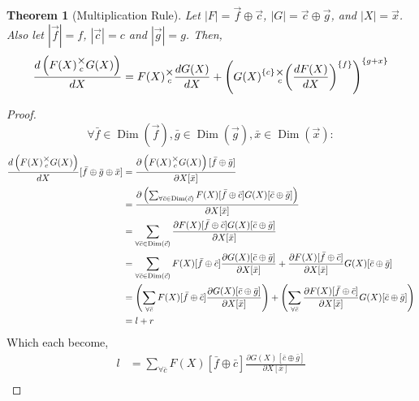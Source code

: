 \documentclass[12pt]{book}
\theoremstyle{plain}
\newtheorem{theorem}{Theorem}[chapter]
\theoremstyle{definition}
\theoremstyle{ppart}
\theoremstyle{case}
\theoremstyle{solution}
\DeclareMathOperator{\Dim}{Dim}
\newcommand{\mmult}[1]{\text{\raisebox{1ex}{$\underset{#1}{\times}$}}}
\newcommand{\shape}[1]{\left|#1\right|}
\newcommand{\transpose}[2]{{#1}^{\{#2\}}}
\begin{document}
\begin{landscape}
\begin{theorem}[Multiplication Rule]
\label{multiplication_rule}
Let $\shape{F} = \vec{f} \oplus \vec{c}$, $\shape{G} = \vec{c} \oplus \vec{g}$,
and $\shape{X} = \vec{x}$.
Also let $\shape{\vec{f}} = f$, $\shape{\vec{c}} = c$ and $\shape{\vec{g}} = g$.
Then,
\begin{align*}
  \frac{d\left(F(X) \mmult{c} G(X)\right)}{dX} =
  F(X) \mmult{c} \frac{dG(X)}{dX} +
  \transpose{\left(
     \transpose{G(X)}{c}
       \mmult{c}
     \transpose{\left( \frac{dF(X)}{dX} \right)}{f}
  \right)}
  {g+x}
\end{align*}
\end{theorem}
\begin{proof}
\[
 \forall
  \bar{f} \in \Dim(\vec{f}),
  \bar{g} \in \Dim(\vec{g}),
  \bar{x} \in \Dim(\vec{x})
 :
\]
\begin{align*}
 \frac{d\left(F(X) \mmult{c} G(X)\right)}{dX}
  [\bar{f} \oplus \bar{g} \oplus \bar{x}]
 &= \frac{
       \partial \left(F(X) \mmult{c} G(X)\right)[\bar{f} \oplus \bar{g}]
    }{
       \partial X[\bar{x}]
    } \\
 &= \frac{
       \partial \left(
        \sum_{\forall \bar{c} \in \Dim(\vec{c})}
         F(X)[\bar{f} \oplus \bar{c}] G(X)[\bar{c} \oplus \bar{g}]
      \right)
    }{
       \partial X[\bar{x}]
    } \\
 &= \sum_{\forall \bar{c} \in \Dim(\vec{c})}
    \frac{
      \partial F(X)[\bar{f} \oplus \bar{c}] G(X)[\bar{c} \oplus \bar{g}]
    }{
      \partial X[\bar{x}]
    }\\
 &= \sum_{\forall \bar{c} \in \Dim(\vec{c})}
    F(X)[\bar{f} \oplus \bar{c}]
    \frac{\partial G(X)[\bar{c} \oplus \bar{g}]}{\partial X[\bar{x}]}
    +
    \frac{\partial F(X)[\bar{f} \oplus \bar{c}]}{\partial X[\bar{x}]}
    G(X)[\bar{c} \oplus \bar{g}] \\
 &=
   \left(
    \sum_{\forall \bar{c}}
      F(X)[\bar{f} \oplus \bar{c}]
      \frac{\partial G(X)[\bar{c} \oplus \bar{g}]}{\partial X[\bar{x}]}
   \right)
   +
   \left(
    \sum_{\forall \bar{c}}
      \frac{\partial F(X)[\bar{f} \oplus \bar{c}]}{\partial X[\bar{x}]}
      G(X)[\bar{c} \oplus \bar{g}]
   \right) \\
 &=
    l + r
\end{align*}
Which each become,
\begin{align*}
 l
 &=
  \sum_{\forall \bar{c}}
    F(X)[\bar{f} \oplus \bar{c}]
    \frac{\partial G(X)[\bar{c} \oplus \bar{g}]}{\partial X[\bar{x}]} \\

\end{align*}
\end{proof}
\end{landscape}
\end{document}
